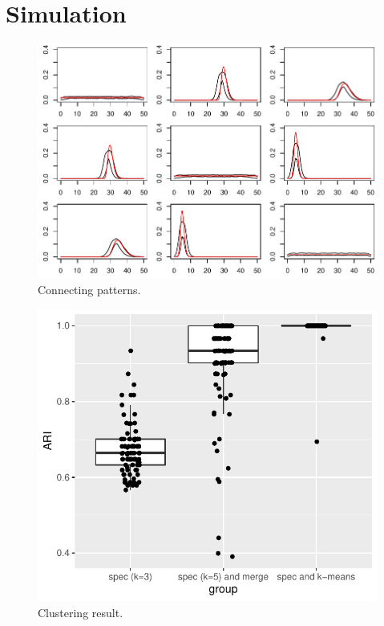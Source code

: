 
\section{Simulation} \label{sec:simulation}


\begin{figure}[H]
\includegraphics[width=\textwidth]{../simulation/plots/center_pdfarray_confband}
\caption{Connecting patterns.}
\end{figure}



\begin{figure}[H]
\includegraphics[width=.8\textwidth]{../simulation/plots/Boxplot_cmpr}
\caption{Clustering result.}
\end{figure}


